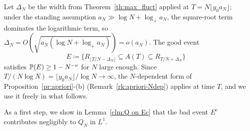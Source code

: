 \documentclass[11pt,a4paper,reqno]{amsart}
\theoremstyle{definition}
\newcommand{\bbP}{{\ensuremath{\mathbb P}} }
\begin{document}
Let $\Delta_N$ be the width from Theorem~\ref{th:max_fluct} applied at $T = N\lfloor y_0 a_N\rfloor$; under the standing assumption $a_N \gg \log N + \log_+ a_N$, the square-root term dominates the logarithmic term, so $\Delta_N = O(\sqrt{a_N(\log N + \log_+ a_N)}) = o(a_N)$. The good event
	\[ E \coloneqq \big\{ R_{\lfloor T/N - \Delta_N\rfloor} \subseteq A(T) \subseteq R_{T/N + \Delta_N} \big\} \]
satisfies $\bbP(E) \geq 1 - N^{-\n}$ for $N$ large enough. Since $T/(N\log N) = \lfloor y_0 a_N\rfloor / \log N \to \infty$, the $N$-dependent form of Proposition~\ref{pr:apriori}-(b) (Remark~\ref{rk:apriori-Ndep}) applies at time $T$, and we use it freely in what follows.

As a first step, we show in Lemma~\ref{clm:Q on Ec} that the bad event $E^c$ contributes negligibly to $Q_N$ in $L^1$.
\end{document}
